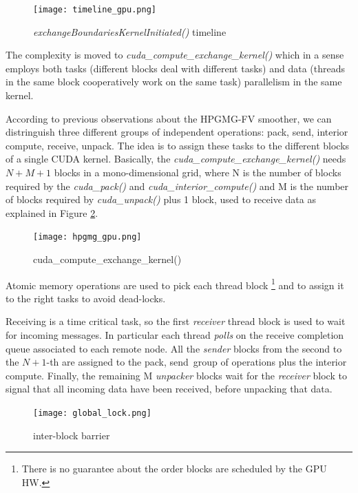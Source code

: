 \documentclass[review]{siamart1116}
\begin{document}
\begin{figure}[h]
\centering
\texttt{[image: timeline\_gpu.png]}
\caption{\textit{exchangeBoundariesKernelInitiated()} timeline}
\label{fig:gpu_initiated_timeline}
\end{figure}


The complexity is moved to \textit{cuda\_compute\_exchange\_kernel()} which
in a sense employs both tasks (different blocks deal with different tasks)
and data (threads in the same block cooperatively work on the same task)
parallelism in the same kernel.

According to previous observations about the HPGMG-FV smoother, we can
distringuish three different groups of independent operations:
\lbrack pack, send\rbrack,
\lbrack interior compute\rbrack,
\lbrack receive, unpack\rbrack.
%
The idea is to assign these tasks to the different blocks of a single CUDA
kernel.
%
Basically, the \textit{cuda\_compute\_exchange\_kernel()} needs $N+M+1$
blocks in a mono-dimensional grid, where N is the number of blocks required
by the \textit{cuda\_pack()} and \textit{cuda\_interior\_compute()} and M
is the number of blocks required by \textit{cuda\_unpack()} plus 1 block,
used to receive data as explained in Figure \ref{fig:gpu_initited}.
%

\begin{figure}[h]
\centering
\texttt{[image: hpgmg\_gpu.png]}
\caption{cuda\_compute\_exchange\_kernel()}
\label{fig:gpu_initited}
\end{figure}


Atomic memory operations are used to pick each thread block
\footnote{There is no guarantee about the order blocks are scheduled by the
  GPU HW.} and to assign it to the right tasks to avoid
dead-locks.

Receiving is a time critical task, so the first \textit{receiver} thread
block is used to wait for incoming messages. In particular each thread
\textit{polls} on the receive completion queue associated to each remote
node.
%
All the \textit{sender} blocks from the second to the $N+1$-th are assigned
to the \lbrack pack, send\rbrack~group of operations plus the \lbrack
interior compute\rbrack.
%
Finally, the remaining M \textit{unpacker} blocks wait for the
\textit{receiver} block to signal that all incoming data have been received,
before unpacking that data.


\begin{figure}[h]
\centering
\texttt{[image: global\_lock.png]}
\caption{inter-block barrier}
\label{fig:global_lock}
\end{figure}
\end{document}
